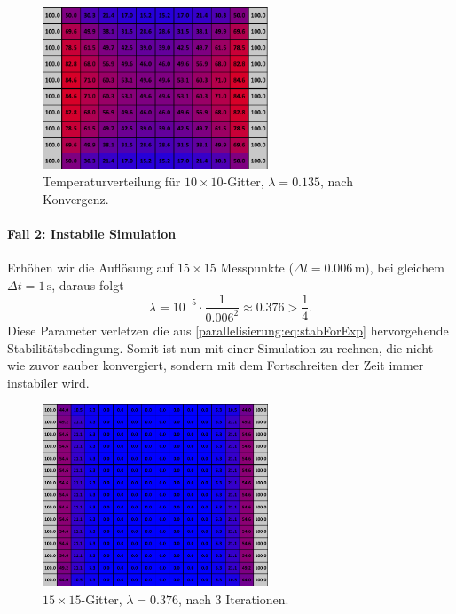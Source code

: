 \begin{figure}[htbp]
	\centering
	\includegraphics[width=0.6\textwidth]{papers/parallelisierung/images/simulation_10x10_0.135.pdf}
	\caption{Temperaturverteilung für \(10\times 10\)-Gitter, \(\lambda = 0.135\), nach Konvergenz.}
	\label{parallelisierung:fig:simulation_10x10_0.135}
\end{figure}

\paragraph{Fall 2: Instabile Simulation}  
Erhöhen wir die Auflösung auf \(15\times 15\) Messpunkte (\(\Delta l = 0.006\,\mathrm{m}\)), bei gleichem \(\Delta t = 1\,\mathrm{s}\), daraus folgt
\[
\lambda =
10^{-5} \cdot \frac{1}{0.006^2}
\approx 0.376 > \frac14.
\]
Diese Parameter verletzen die aus \eqref{parallelisierung:eq:stabForExp} hervorgehende Stabilitätsbedingung. Somit ist nun mit einer Simulation zu rechnen, die nicht wie zuvor sauber konvergiert, sondern mit dem Fortschreiten der Zeit immer instabiler wird.

\begin{figure}[htbp]
	\centering
	\includegraphics[width=0.6\textwidth]{papers/parallelisierung/images/simulation_15x15_0.376_3it.pdf}
	\caption{\(15\times 15\)-Gitter, \(\lambda = 0.376\), nach 3 Iterationen.}
	\label{parallelisierung:fig:simulation_15x15_0.376_3it}
\end{figure}


